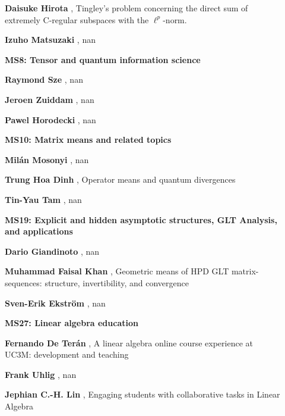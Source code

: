 \documentclass[ILAS2025-program.tex]{subfiles}
\begin{document}
\begin{description}
\begin{description}
        \item[] \textbf{Daisuke Hirota} , Tingley's problem concerning the direct sum of extremely C-regular subspaces with the $\ell^p$-norm.
        \item[] \textbf{Izuho Matsuzaki} , nan
        \end{description}
    \begin{description}
    \item[] {\color{mstitle}\textbf{MS8: Tensor and quantum information science}} 
    \item[] \textbf{Raymond Sze} , nan
        \item[] \textbf{Jeroen Zuiddam} , nan
        \item[] \textbf{Pawel Horodecki} , nan
        \end{description}
    \begin{description}
    \item[] {\color{mstitle}\textbf{MS10: Matrix means and related topics}} 
    \item[] \textbf{Milán Mosonyi} , nan
        \item[] \textbf{Trung Hoa Dinh} , Operator means and quantum divergences
        \item[] \textbf{Tin-Yau Tam} , nan
        \end{description}
    \begin{description}
    \item[] {\color{mstitle}\textbf{MS19: Explicit and hidden asymptotic structures, GLT Analysis, and applications}} 
    \item[] \textbf{Dario Giandinoto} , nan
        \item[] \textbf{Muhammad Faisal Khan} , Geometric means of HPD GLT matrix-sequences: structure, invertibility, and convergence
        \item[] \textbf{Sven-Erik Ekström} , nan
        \end{description}
    \begin{description}
    \item[] {\color{mstitle}\textbf{MS27: Linear algebra education}} 
    \item[] \textbf{Fernando De Terán} , A linear algebra online course experience at UC3M: development and teaching
        \item[] \textbf{Frank Uhlig} , nan
        \item[] \textbf{Jephian C.-H. Lin} , Engaging students with collaborative tasks in Linear Algebra


\end{description}
\end{description}
\end{document}
